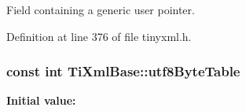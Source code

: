 Field containing a generic user pointer. 



Definition at line 376 of file tinyxml.h.

\hypertarget{classTiXmlBase_ac8c86058137bdb4b413c3eca58f2d467}{
\subsubsection[{utf8ByteTable}]{\setlength{\rightskip}{0pt plus 5cm}const int {\bf TiXmlBase::utf8ByteTable}}}
\label{d8/d47/classTiXmlBase_ac8c86058137bdb4b413c3eca58f2d467}
{\bfseries Initial value:}
